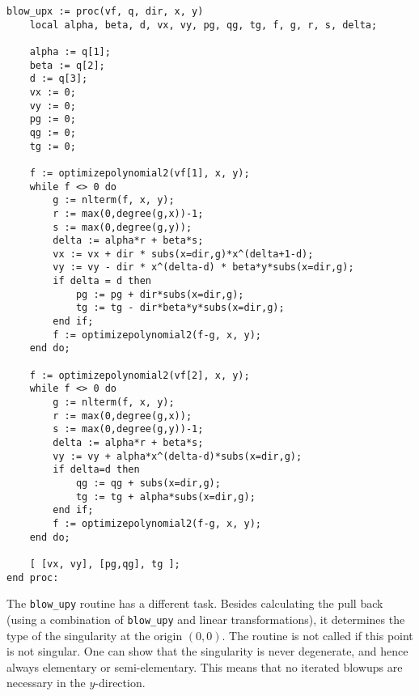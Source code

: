 \documentclass[a4paper,10pt]{article}
\begin{document}
\begin{lstlisting}[name=blowup]
blow_upx := proc(vf, q, dir, x, y)
    local alpha, beta, d, vx, vy, pg, qg, tg, f, g, r, s, delta;

    alpha := q[1];
    beta := q[2];
    d := q[3];
    vx := 0;
    vy := 0;
    pg := 0;
    qg := 0;
    tg := 0;

    f := optimizepolynomial2(vf[1], x, y);
    while f <> 0 do
        g := nlterm(f, x, y);
        r := max(0,degree(g,x))-1;
        s := max(0,degree(g,y));
        delta := alpha*r + beta*s;
        vx := vx + dir * subs(x=dir,g)*x^(delta+1-d);
        vy := vy - dir * x^(delta-d) * beta*y*subs(x=dir,g);
        if delta = d then
            pg := pg + dir*subs(x=dir,g);
            tg := tg - dir*beta*y*subs(x=dir,g);
        end if;
        f := optimizepolynomial2(f-g, x, y);
    end do;

    f := optimizepolynomial2(vf[2], x, y);
    while f <> 0 do
        g := nlterm(f, x, y);
        r := max(0,degree(g,x));
        s := max(0,degree(g,y))-1;
        delta := alpha*r + beta*s;
        vy := vy + alpha*x^(delta-d)*subs(x=dir,g);
        if delta=d then
            qg := qg + subs(x=dir,g);
            tg := tg + alpha*subs(x=dir,g);
        end if;
        f := optimizepolynomial2(f-g, x, y);
    end do;

    [ [vx, vy], [pg,qg], tg ];
end proc:
\end{lstlisting}

The \verb+blow_upy+ routine has a different task.  Besides calculating the pull back (using
a combination of \verb+blow_upy+ and linear transformations), it determines the type of
the singularity at the origin $(0,0)$.  The routine is not called if this point is not singular.
One can show that the singularity is never degenerate, and hence always elementary or semi-elementary.
This means that no iterated blowups are necessary in the $y$-direction.
\end{document}
